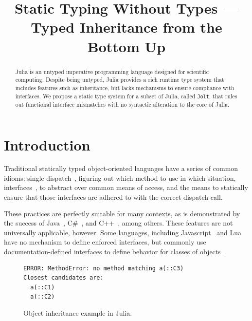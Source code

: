 \documentclass[preprint]{sigplanconf}
\newcommand{\xt}[1]{\texttt{#1}}
\newcommand{\jolt}{\xt{Jolt}}
\begin{document}
\title{Static Typing Without Types --- Typed Inheritance from the Bottom Up} 
\maketitle

\begin{abstract}
Julia is an untyped imperative programming language designed for scientific computing. 
Despite being untyped, Julia provides a rich runtime type system that includes features such as  
inheritance, but lacks mechanisms to ensure compliance with interfaces.
We propose a static type system for a subset of Julia, called \jolt, that rules out functional interface mismatches
with no syntactic alteration to the core of Julia.
\end{abstract}


\section{Introduction}

Traditional statically typed object-oriented languages have a series of
common idioms: single dispatch~\cite{jls}, figuring out which method
to use in which situation, interfaces~\cite{objinter, fj}, to abstract over 
common means of access, and the means to statically
ensure that those interfaces are adhered to with the correct dispatch call.

These practices are perfectly suitable for many contexts,
as is demonstrated by the success of Java~\cite{jls}, C\#~\cite{csls}, and C++~\cite{cppls}, among others.
These features are not universally applicable, however. Some languages, including
Javascript~\cite{ecma} and Lua~\cite{lualang} have no mechanism to define enforced
interfaces, but commonly use documentation-defined interfaces to define behavior
for classes of objects~\cite{lualang}.

\begin{figure}[h]


\begin{Verbatim}[fontsize=\scriptsize]
ERROR: MethodError: no method matching a(::C3)
Closest candidates are:
  a(::C1)
  a(::C2)
\end{Verbatim}
\caption{Object inheritance example in Julia.}
\label{code:broken}
\end{figure}
\end{document}
